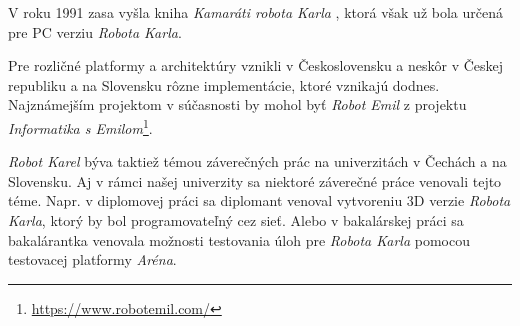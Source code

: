 V roku 1991 zasa vyšla kniha \emph{Kamaráti robota Karla} \cite{Gasparovicova1991}, ktorá však už bola určená pre PC verziu \emph{Robota Karla}.

Pre rozličné platformy a architektúry vznikli v Československu a neskôr v Českej republiku a na Slovensku rôzne implementácie, ktoré vznikajú dodnes. Najznámejším projektom v súčasnosti by mohol byť \emph{Robot Emil} z projektu \emph{Informatika s Emilom}\footnote{\url{https://www.robotemil.com/}}.

\emph{Robot Karel} býva taktiež témou záverečných prác na univerzitách v Čechách a na Slovensku. Aj v rámci našej univerzity sa niektoré záverečné práce venovali tejto téme. Napr. v diplomovej práci \cite{Valo2012} sa diplomant venoval vytvoreniu 3D verzie \emph{Robota Karla}, ktorý by bol programovateľný cez sieť. Alebo v bakalárskej práci \cite{Parackova2017} sa bakalárantka venovala možnosti testovania úloh pre \emph{Robota Karla} pomocou testovacej platformy \emph{Aréna}.

